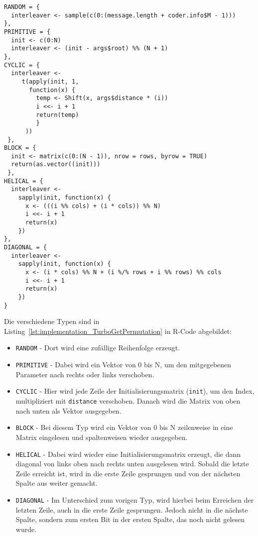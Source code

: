 \begin{lstlisting}[caption=Implementierung von \texttt{TurboGetPermutation}, label={lst:implementation_TurboGetPermutation}, float=!th]
RANDOM = {
  interleaver <- sample(c(0:(message.length + coder.info$M - 1)))
},
PRIMITIVE = {
  init <- c(0:N)
  interleaver <- (init - args$root) %% (N + 1)
},
CYCLIC = {
  interleaver <-
     t(apply(init, 1,
       function(x) {
         temp <- Shift(x, args$distance * (i))
         i <<- i + 1
         return(temp)
         }
      ))
 },
BLOCK = {
  init <- matrix(c(0:(N - 1)), nrow = rows, byrow = TRUE)
  return(as.vector((init)))
 },
HELICAL = {
  interleaver <-
    sapply(init, function(x) {
      x <- (((i %% cols) + (i * cols)) %% N)
      i <<- i + 1
      return(x)
    })
},
DIAGONAL = {
  interleaver <-
    sapply(init, function(x) {
      x <- (i * cols) %% N + (i %/% rows + i %% rows) %% cols
      i <<- i + 1
      return(x)
    })
}
\end{lstlisting}

Die verschiedene Typen sind in Listing~\ref{lst:implementation_TurboGetPermutation} in R-Code abgebildet:

\begin{itemize}
\item \texttt{RANDOM} - Dort wird eine zufällige Reihenfolge erzeugt.
\item \texttt{PRIMITIVE} - Dabei wird ein Vektor von 0 bis N, um den mitgegebenen Parameter nach rechts oder links verschoben.
\item \texttt{CYCLIC} - Hier wird jede Zeile der Initialisierungsmatrix (\texttt{init}), um den Index, multipliziert mit \texttt{distance} verschoben. Danach wird die Matrix von oben nach unten als Vektor ausgegeben.
\item \texttt{BLOCK} - Bei diesem Typ wird ein Vektor von 0 bis N zeilenweise in eine Matrix eingelesen und spaltenweisen wieder ausgegeben.
\item \texttt{HELICAL} - Dabei wird wieder eine Initialisierungsmatrix erzeugt, die dann diagonal von links oben nach rechts unten ausgelesen wird. Sobald die letzte Zeile erreicht ist, wird in die erste Zeile gesprungen und von der nächsten Spalte aus weiter gemacht.
\item \texttt{DIAGONAL} - Im Unterschied zum vorigen Typ, wird hierbei beim Erreichen der letzten Zeile, auch in die erste Zeile gesprungen. Jedoch nicht in die nächste Spalte, sondern zum ersten Bit in der ersten Spalte, das noch nicht gelesen wurde.
\end{itemize}

